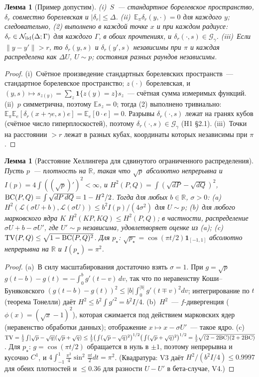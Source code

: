 \documentclass[11pt,a4paper]{article}
\numberwithin{equation}{section}
\newtheorem{lemma}[theorem]{Лемма}
\theoremstyle{definition}
\theoremstyle{remark}
\newcommand{\E}{\mathbb E}\newcommand{\R}{\mathbb R}\newcommand{\Z}{\mathbb Z}\let\Prob\relax\newcommand{\Prob}{\mathbb P}
\newcommand{\norm}[1]{\lVert #1\rVert}\newcommand{\abs}[1]{\lvert #1\rvert}\newcommand{\ip}[2]{\langle #1,#2\rangle}
\newcommand{\cN}{\mathcal N}\newcommand{\cA}{\mathcal A}\newcommand{\cG}{\mathcal G}\newcommand{\cF}{\mathcal F}
\begin{document}
\begin{lemma}[Пример допустим]\label{lem:inclass}
(i)~$S$~--- стандартное борелевское пространство, $\delta_r$ совместно борелевская и $\abs{\delta_r}\le\Delta$. (ii)~$\E_\pi\delta_r(y,\cdot)=0$ для каждого $y$; следовательно, (2) выполнено в каждой точке $x$ и при каждом радиусе: $\delta_r\in\cN_\iid(\Delta;\Gamma)$ для каждого $\Gamma$, в обоих прочтениях, и $\delta_r(\cdot,s)\in\cG_\gamma$. (iii)~Если $\norm{y-y'}>r$, то $\delta_r(y,s)$ и $\delta_r(y',s)$ независимы при $\pi$ и каждая распределена как $\Delta U$, $U\sim p$; состояния разных раундов независимы.
\end{lemma}
\begin{proof}
(i)~Счётное произведение стандартных борелевских пространств~--- стандартное борелевское пространство; $z(\cdot)$ борелевская, и $(y,s)\mapsto s_{z(y)}=\sum_z\mathbf 1\{z(y)=z\}s_z$~--- счётная сумма измеримых функций. (ii)~$p$ симметрична, поэтому $\E s_z=0$; тогда (2) выполнено тривиально: $\E_\pi\E_e[\delta_r(x+\gamma e,s)e]=\E_e[0\cdot e]=0$. Разрывы $\delta_r(\cdot,s)$ лежат на гранях кубов (счётное число гиперплоскостей), поэтому $\delta_r(\cdot,s)\in\cG_\gamma$ (H1 \S2.1). (iii)~Точки на расстоянии $>r$ лежат в разных кубах, координаты которых независимы при $\pi$.
\end{proof}

\begin{lemma}[Расстояние Хеллингера для сдвинутого ограниченного распределения]\label{lem:hell}
Пусть $p$~--- плотность на $\R$, такая что $\sqrt p$ абсолютно непрерывна и $I(p)=4\int((\sqrt p)')^2<\infty$, и $H^2(P,Q)=\int(\sqrt{dP}-\sqrt{dQ})^2$, $\mathrm{BC}(P,Q)=\int\sqrt{dP\,dQ}=1-H^2/2$. Тогда для любых $b\in\R$, $\sigma>0$:
(a)~$H^2(\mathcal L(\sigma U+b),\mathcal L(\sigma U))\le b^2I(p)/(4\sigma^2)$ для $U\sim p$;
(b)~для любого марковского ядра $K$ $H^2(KP,KQ)\le H^2(P,Q)$; в частности, распределение $\sigma U+b-\sigma U'$, где $U'\sim p$ независима, удовлетворяет оценке из (a);
(c)~$\mathrm{TV}(P,Q)\le\sqrt{1-\mathrm{BC}(P,Q)^2}$.
Для $p_\star$: $\sqrt{p_\star}=\cos(\pi t/2)\mathbf 1_{[-1,1]}$ абсолютно непрерывна на $\R$ и $I(p_\star)=\pi^2$.
\end{lemma}
\begin{proof}
(a)~В силу масштабирования достаточно взять $\sigma=1$. При $g=\sqrt p$ $g(t-b)-g(t)=-\int_0^bg'(t-v)\,dv$, так что по неравенству Коши--Буняковского $(g(t-b)-g(t))^2\le\abs b\int_0^{\abs b}g'(t\mp v)^2dv$; интегрирование по $t$ (теорема Тонелли) даёт $H^2\le b^2\int g'^2=b^2I/4$. (b)~$H^2$~--- $f$-дивергенция ($\phi(x)=(\sqrt x-1)^2$), которая сжимается под действием марковских ядер (неравенство обработки данных); отображение $x\mapsto x-\sigma U'$~--- такое ядро. (c)~$\TV=\frac12\int\abs{\sqrt p-\sqrt q}(\sqrt p+\sqrt q)\le\frac12\big(\int(\sqrt p-\sqrt q)^2\big)^{1/2}\big(\int(\sqrt p+\sqrt q)^2\big)^{1/2}=\frac12\sqrt{(2-2\BC)(2+2\BC)}$. Для $p_\star$: $g=\cos(\pi t/2)$ обращается в нуль в $\pm1$, поэтому непрерывна и кусочно $C^1$, и $4\int_{-1}^1\frac{\pi^2}4\sin^2\frac{\pi t}2dt=\pi^2$. (Квадратура: V3 даёт $H^2/(b^2I/4)\le0.9997$ для обеих плотностей и $\le0.36$ для разности $U-U'$ в бета-случае, V4.)
\end{proof}
\end{document}
